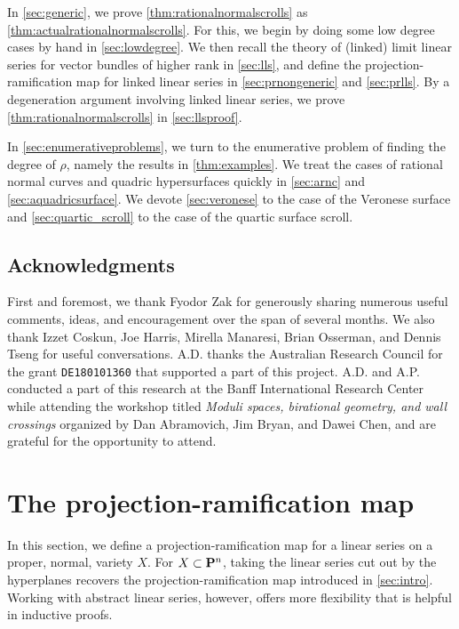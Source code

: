 \documentclass[11pt,reqno]{amsart}
\theoremstyle{plain}
\theoremstyle{definition}
\theoremstyle{remark}
\numberwithin{equation}{section}
\numberwithin{equation}{section}
\begin{document}
In \autoref{sec:generic}, we prove \autoref{thm:rationalnormalscrolls} as \autoref{thm:actualrationalnormalscrolls}.
For this, we begin by doing some low degree cases by hand in \autoref{sec:lowdegree}.
We then recall the theory of (linked) limit linear series for vector bundles of higher rank in \autoref{sec:lls}, and define the projection-ramification map for linked linear series in \autoref{sec:prnongeneric} and \autoref{sec:prlls}.
By a degeneration argument involving linked linear series, we prove \autoref{thm:rationalnormalscrolls} in \autoref{sec:llsproof}.

In \autoref{sec:enumerativeproblems}, we turn to the enumerative problem of finding the degree of $\rho$, namely the results in \autoref{thm:examples}.
We treat the cases of rational normal curves and quadric hypersurfaces quickly in \autoref{sec:arnc} and \autoref{sec:aquadricsurface}.
We devote \autoref{sec:veronese} to the case of the Veronese surface and \autoref{sec:quartic_scroll} to the case of the quartic surface scroll.

\subsection*{Acknowledgments}
First and foremost, we thank Fyodor Zak for generously sharing numerous useful comments, ideas, and encouragement over the span of several months.
We also thank Izzet Coskun, Joe Harris, Mirella Manaresi, Brian Osserman, and Dennis Tseng for useful conversations. 
A.D. thanks the Australian Research Council for the grant \texttt{DE180101360} that supported a part of this project.
A.D. and A.P. conducted a part of this research at the Banff International Research Center while attending the workshop titled \emph{Moduli spaces, birational geometry, and wall crossings} organized by Dan Abramovich, Jim Bryan, and Dawei Chen, and are grateful for the opportunity to attend.

\section{The projection-ramification map}\label{sec:prmap}
In this section, we define a projection-ramification map for a linear series on a proper, normal, variety $X$.
For $X \subset \P^n$, taking the linear series cut out by the hyperplanes recovers the projection-ramification map introduced in \autoref{sec:intro}.
Working with abstract linear series, however, offers more flexibility that is helpful in inductive proofs.
\end{document}
